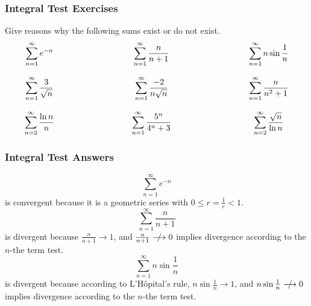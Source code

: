\documentclass[xcolor=dvipsnames]{beamer}
\begin{document}
\begin{frame}
  \frametitle{Integral Test Exercises}
  Give reasons why the following sums exist or do not exist.
  \begin{equation}
    \label{eq:oosuphif}
    \begin{array}{ccccc}
      \displaystyle \sum_{n=1}^{\infty}e^{-n} & \hspace{1in} & \displaystyle \sum_{n=1}^{\infty}\frac{n}{n+1} & \hspace{1in} & \displaystyle \sum_{n=1}^{\infty}n\sin\frac{1}{n} \\
      & \hspace{1in} & \\
      \displaystyle \sum_{n=1}^{\infty}\frac{3}{\sqrt{n}} & \hspace{1in} & \displaystyle \sum_{n=1}^{\infty}\frac{-2}{n\sqrt{n}} & & \displaystyle \sum_{n=1}^{\infty}\frac{n}{n^{2}+1} \\
      & \hspace{1in} & \\
      \displaystyle \sum_{n=2}^{\infty}\frac{\ln{}n}{n} & \hspace{1in} & \displaystyle \sum_{n=1}^{\infty}\frac{5^{n}}{4^{n}+3} & & \displaystyle \sum_{n=2}^{\infty}\frac{\sqrt{n}}{\ln{}n}\\
    \end{array}\notag
  \end{equation}
\end{frame}

\begin{frame}
  \frametitle{Integral Test Answers}
  \begin{equation}
    \label{eq:epeiveix}
    \sum_{n=1}^{\infty}e^{-n}
  \end{equation}
is convergent because it is a geometric series with
$0\leq{}r=\frac{1}{e}<1$.
\begin{equation}
  \label{eq:bauveeze}
\sum_{n=1}^{\infty}\frac{n}{n+1}  
\end{equation}
is divergent because $\frac{n}{n+1}\longrightarrow{}1$, and
$\frac{n}{n+1}\qeq{}0$ implies divergence
according to the $n$-the term test.
\begin{equation}
  \label{eq:uithaezi}
\sum_{n=1}^{\infty}n\sin\frac{1}{n}  
\end{equation}
is divergent because according to L'H{\^o}pital's rule,
$n\sin\frac{1}{n}\longrightarrow{}1$, and $n\sin\frac{1}{n}\qeq{}0$ implies divergence
according to the $n$-the term test.
\end{frame}
\end{document}
